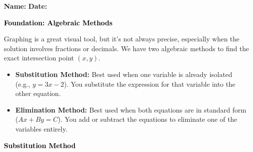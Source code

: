 \documentclass[12pt, letterpaper, fleqn]{article}
\begin{document}
\textbf{Name:} \underline{\hspace{5cm}}
\hfill
\textbf{Date:} \underline{\hspace{3cm}}\\

\begin{tcolorbox}[colback=customteal!20]
    \large\textcolor{black}{\textbf{Foundation: Algebraic Methods}}
\end{tcolorbox}

\vspace{3mm}

\noindent
Graphing is a great visual tool, but it's not always precise, especially when the solution involves fractions or decimals. We have two algebraic methods to find the exact intersection point $(x, y)$.

\begin{itemize}
    \item \textbf{Substitution Method:} Best used when one variable is already isolated (e.g., $y = 3x - 2$). You substitute the expression for that variable into the other equation.
    \item \textbf{Elimination Method:} Best used when both equations are in standard form ($Ax + By = C$). You add or subtract the equations to eliminate one of the variables entirely.
\end{itemize}

\vspace{4mm}

\begin{tcolorbox}[colback=customteal!20]
\large\textcolor{black}{\textbf{Substitution Method}}
\end{tcolorbox}
\end{document}
